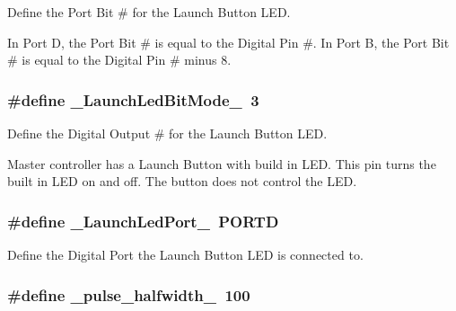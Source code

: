 \-Define the \-Port \-Bit \# for the \-Launch \-Button \-L\-E\-D. 

\-In \-Port \-D, the \-Port \-Bit \# is equal to the \-Digital \-Pin \#. \-In \-Port \-B, the \-Port \-Bit \# is equal to the \-Digital \-Pin \# minus 8. \hypertarget{remotePanel_8ino_a834965132d8d0a67717adec607303b13}{
\subsubsection[{\-\_\-\-Launch\-Led\-Bit\-Mode\-\_\-}]{\setlength{\rightskip}{0pt plus 5cm}\#define {\bf \-\_\-\-Launch\-Led\-Bit\-Mode\-\_\-}~3}}\label{remotePanel_8ino_a834965132d8d0a67717adec607303b13}


\-Define the \-Digital \-Output \# for the \-Launch \-Button \-L\-E\-D. 

\-Master controller has a \-Launch \-Button with build in \-L\-E\-D. \-This pin turns the built in \-L\-E\-D on and off. \-The button does not control the \-L\-E\-D. \hypertarget{remotePanel_8ino_a2ebaf073a30ca8e1bd042ab46eb35cb4}{
\subsubsection[{\-\_\-\-Launch\-Led\-Port\-\_\-}]{\setlength{\rightskip}{0pt plus 5cm}\#define {\bf \-\_\-\-Launch\-Led\-Port\-\_\-}~\-P\-O\-R\-T\-D}}\label{remotePanel_8ino_a2ebaf073a30ca8e1bd042ab46eb35cb4}


\-Define the \-Digital \-Port the \-Launch \-Button \-L\-E\-D is connected to. 

\hypertarget{remotePanel_8ino_a9a8dc8e6e75e845a90d783b02b6be855}{
\subsubsection[{\-\_\-pulse\-\_\-halfwidth\-\_\-}]{\setlength{\rightskip}{0pt plus 5cm}\#define {\bf \-\_\-pulse\-\_\-halfwidth\-\_\-}~100}}\label{remotePanel_8ino_a9a8dc8e6e75e845a90d783b02b6be855}


